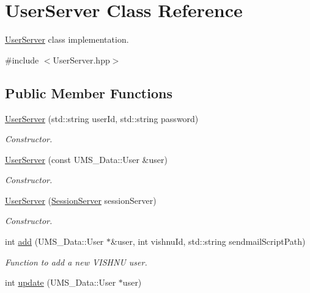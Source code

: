 \hypertarget{classUserServer}{
\section{UserServer Class Reference}
\label{classUserServer}
}


\hyperlink{classUserServer}{UserServer} class implementation.  




{\ttfamily \#include $<$UserServer.hpp$>$}

\subsection*{Public Member Functions}
\begin{DoxyCompactItemize}
\item 
\hyperlink{classUserServer_a64281da3f0076b3273bf9e83123211a2}{UserServer} (std::string userId, std::string password)
\begin{DoxyCompactList}\small\item\em Constructor. \item\end{DoxyCompactList}\item 
\hyperlink{classUserServer_a5b19188b031a3ab5fc40cabc2a097b1d}{UserServer} (const UMS\_\-Data::User \&user)
\begin{DoxyCompactList}\small\item\em Constructor. \item\end{DoxyCompactList}\item 
\hyperlink{classUserServer_a2a8ac1a46357a5fb7d10ea741b534b3d}{UserServer} (\hyperlink{classSessionServer}{SessionServer} sessionServer)
\begin{DoxyCompactList}\small\item\em Constructor. \item\end{DoxyCompactList}\item 
int \hyperlink{classUserServer_a86ac31bb630ea859c06bc1127eea2c9a}{add} (UMS\_\-Data::User $\ast$\&user, int vishnuId, std::string sendmailScriptPath)
\begin{DoxyCompactList}\small\item\em Function to add a new VISHNU user. \item\end{DoxyCompactList}\item 
int \hyperlink{classUserServer_a6653ef686b1622001ca6b211da5d9f3b}{update} (UMS\_\-Data::User $\ast$user)

\end{DoxyCompactItemize}
